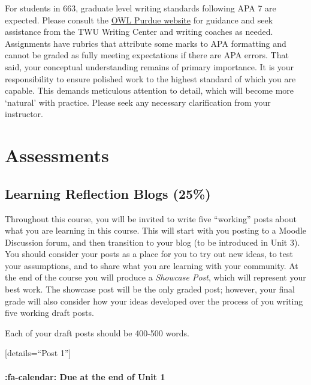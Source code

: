 \documentclass[
]{book}
\begin{document}
For students in 663, graduate level writing standards following APA 7 are expected. Please consult the \href{https://owl.purdue.edu/owl/research_and_citation/apa_style/apa_style_introduction.html}{OWL Purdue website} for guidance and seek assistance from the TWU Writing Center and writing coaches as needed. Assignments have rubrics that attribute some marks to APA formatting and cannot be graded as fully meeting expectations if there are APA errors. That said, your conceptual understanding remains of primary importance. It is your responsibility to ensure polished work to the highest standard of which you are capable. This demands meticulous attention to detail, which will become more `natural' with practice. Please seek any necessary clarification from your instructor.

\hypertarget{assessments}{%
\chapter{Assessments}\label{assessments}}

\hypertarget{learning-reflection-blogs-25}{%
\section{Learning Reflection Blogs (25\%)}\label{learning-reflection-blogs-25}}

Throughout this course, you will be invited to write five ``working'' posts about what you are learning in this course. This will start with you posting to a Moodle Discussion forum, and then transition to your blog (to be introduced in Unit 3). You should consider your posts as a place for you to try out new ideas, to test your assumptions, and to share what you are learning with your community. At the end of the course you will produce a \emph{Showcase Post}, which will represent your best work. The showcase post will be the only graded post; however, your final grade will also consider how your ideas developed over the process of you writing five working draft posts.

Each of your draft posts should be 400-500 words.

{[}details=``Post 1''{]}

\hypertarget{fa-calendar-due-at-the-end-of-unit-1}{%
\subsubsection{:fa-calendar: Due at the end of Unit 1}\label{fa-calendar-due-at-the-end-of-unit-1}}
\end{document}
